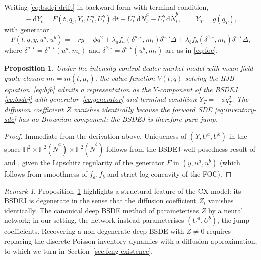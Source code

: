 \documentclass[11pt,a4paper]{article}
\newtheorem{proposition}[theorem]{Proposition}
\theoremstyle{definition}
\theoremstyle{remark}
\newtheorem{remark}[theorem]{Remark}
\newcommand{\dd}{\mathrm{d}}
\newcommand{\Nt}{\widetilde{N}}
\begin{document}
Writing \eqref{eq:bsdej-drift} in backward form with terminal
condition,
\begin{equation}\label{eq:bsdej}
\boxed{\;
-\dd Y_t = F(t, q_t, Y_t, U^a_t, U^b_t) \, \dd t
- U^a_t \, \dd \Nt^a_t - U^b_t \, \dd \Nt^b_t,
\qquad
Y_T = g(q_T),
\;}
\end{equation}
with generator
\begin{equation}\label{eq:generator}
F(t, q, y, u^a, u^b) =
-r y - \phi q^2
+ \lambda_a f_a(\delta^{a,\star}, m_t) \delta^{a,\star} \Delta
+ \lambda_b f_b(\delta^{b,\star}, m_t) \delta^{b,\star} \Delta,
\end{equation}
where $\delta^{a,\star} = \delta^{a,\star}(u^a, m_t)$ and
$\delta^{b,\star} = \delta^{b,\star}(u^b, m_t)$ are as in
\eqref{eq:foc}.

\begin{proposition}\label{prop:bsdej-representation}
Under the \citet{cont2024} intensity-control dealer-market model
with mean-field quote closure $m_t = m(t, \mu_t)$, the value
function $V(t, q)$ solving the HJB equation~\eqref{eq:hjb} admits
a representation as the $Y$-component of the BSDEJ
\eqref{eq:bsdej} with generator~\eqref{eq:generator} and
terminal condition $Y_T = -\phi q_T^2$.  The diffusion coefficient
$Z$ vanishes identically because the forward SDE
\eqref{eq:inventory-sde} has no Brownian component; the BSDEJ is
therefore pure-jump.
\end{proposition}

\begin{proof}
Immediate from the derivation above.  Uniqueness of
$(Y, U^a, U^b)$ in the space
$\mathbb{H}^2 \times \mathbb{H}^2(\Nt^a) \times \mathbb{H}^2(\Nt^b)$
follows from the BSDEJ well-posedness result of
\citet{barles1997} and \citet{tang1994}, given the Lipschitz
regularity of the generator $F$ in $(y, u^a, u^b)$ (which follows
from smoothness of $f_a, f_b$ and strict log-concavity of the
FOC).
\end{proof}

\begin{remark}\label{rem:Z-zero-degeneracy}
Proposition~\ref{prop:bsdej-representation} highlights a structural
feature of the CX model: its BSDEJ is degenerate in the sense that
the diffusion coefficient $Z_t$ vanishes identically.  The
canonical deep BSDE method of \citet{han2018} parameterises $Z$ by
a neural network; in our setting, the network instead parameterises
$(U^a, U^b)$, the jump coefficients.  Recovering a non-degenerate
deep BSDE with $Z \neq 0$ requires replacing the discrete Poisson
inventory dynamics with a diffusion approximation, to which we
turn in Section~\ref{sec:feng-existence}.
\end{remark}
\end{document}
